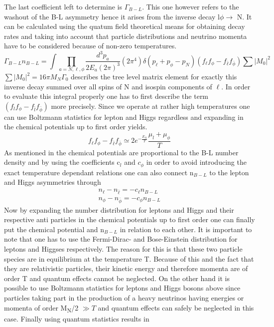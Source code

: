 The last coefficient left to determine is $\Gamma_{B-L}$. This one however refers to the washout of the B-L asymmetry hence it arises from the inverse decay l$\phi\rightarrow$ N. It can be calculated using the quatum field theoretical means for obtaining decay rates and taking into account that particle distributions and neutrino momenta have to be considered because of non-zero temperatures.
\begin{equation}
\Gamma_{B-L}n_{B-L}=\int\prod_{a=N,\ell,\phi}\frac{d^3p_a}{2E_a(2\pi)^3}(2\pi^4)\delta(p_\ell+p_\phi-p_N)(	f_\ell f_\phi-f_{\bar{\ell}}f_{\bar{\phi}})\sum|M_0|^2
\label{eq:Gamma_B-L}
\end{equation}
$\sum|M_0|^2=16\pi M_N\Gamma_0$ describes the tree level matrix element for exactly this inverse decay summed over all spins of N and isospin components of $\ell$. In order to evaluate this integral properly one has to first describe the term $(	f_lf_\phi-f_{\bar{l}}f_{\bar{\phi}})$ more precisely. Since we operate at rather high temperatures one can use Boltzmann statistics for lepton and Higgs regardless and expanding in the chemical potentials up to first order yields.
\begin{equation}
	f_\ell f_\phi-f_{\bar{\ell}}f_{\bar{\phi}}\simeq 2e^{-\frac{E_N}{T}}\frac{\mu_l+\mu_\phi}{T}
	\label{eq:distri_diff}
\end{equation}
As mentioned in \cite[p. 7]{Bodeker:2013qaa} the chemical potentials are proportional to the B-L number density and by using the coefficients c$_l$ and $c_\phi$ in order to avoid introducing the exact temperature dependant relations one can also connect n$_{B-L}$ to the lepton and Higgs asymmetries through \cite[p. 7]{Bodeker:2013qaa}
\begin{align}
	n_\ell-n_{\bar{\ell}}=-c_\ell n_{B-L}
	\label{eq:l-lbar} \\
	n_\phi-n_{\bar{\phi}}=-c_\phi n_{B-L}
	\label{eq:phi-phibar}
\end{align}
Now by expanding the number distribution for leptons and Higgs and their respective anti particles in the chemical potentials up to first order one can finally put the chemical potential and n$_{B-L}$ in relation to each other. It is important to note that one has to use the Fermi-Dirac- and Bose-Einstein distribution for leptons and Higgses respectively. The reason for this is that these two particle species are in equilibrium at the temperature T. Because of this and the fact that they are relativistic particles, their kinetic energy and therefore momenta are of order T and quantum effects cannot be neglected. On the other hand it is possible to use Boltzmann statistics for leptons and Higgs bosons above since particles taking part in the production of a heavy neutrinos having energies or momenta of order M\textsubscript{N}/2 $\gg T$ and quantum effects can safely be neglected in this case. Finally using quantum statistics results in

